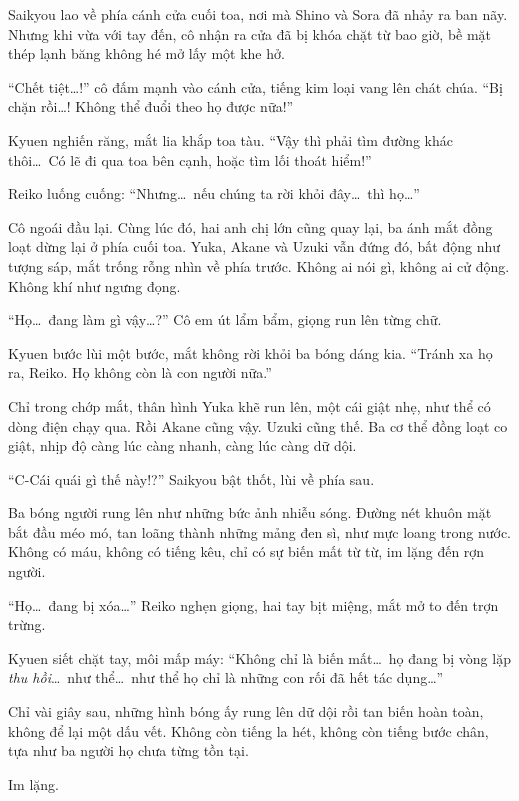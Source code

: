 \documentclass[../main.tex]{subfiles}
\begin{document}
Saikyou lao về phía cánh cửa cuối toa, nơi mà Shino và Sora đã nhảy ra ban nãy. Nhưng khi vừa với tay đến, cô nhận ra cửa đã bị khóa chặt từ bao giờ, bề mặt thép lạnh băng không hé mở lấy một khe hở.

``Chết tiệt\dots!'' cô đấm mạnh vào cánh cửa, tiếng kim loại vang lên chát chúa. ``Bị chặn rồi\dots! Không thể đuổi theo họ được nữa!''

Kyuen nghiến răng, mắt lia khắp toa tàu. ``Vậy thì phải tìm đường khác thôi\dots\ Có lẽ đi qua toa bên cạnh, hoặc tìm lối thoát hiểm!''

Reiko luống cuống: ``Nhưng\dots\ nếu chúng ta rời khỏi đây\dots\ thì họ\dots''

Cô ngoái đầu lại. Cùng lúc đó, hai anh chị lớn cũng quay lại, ba ánh mắt đồng loạt dừng lại ở phía cuối toa. Yuka, Akane và Uzuki vẫn đứng đó, bất động như tượng sáp, mắt trống rỗng nhìn về phía trước. Không ai nói gì, không ai cử động. Không khí như ngưng đọng.


``Họ\dots\ đang làm gì vậy\dots?'' Cô em út lẩm bẩm, giọng run lên từng chữ.

Kyuen bước lùi một bước, mắt không rời khỏi ba bóng dáng kia. ``Tránh xa họ ra, Reiko. Họ không còn là con người nữa.''

Chỉ trong chớp mắt, thân hình Yuka khẽ run lên, một cái giật nhẹ, như thể có dòng điện chạy qua. Rồi Akane cũng vậy. Uzuki cũng thế. Ba cơ thể đồng loạt co giật, nhịp độ càng lúc càng nhanh, càng lúc càng dữ dội.

``C-Cái quái gì thế này!?'' Saikyou bật thốt, lùi về phía sau.

Ba bóng người rung lên như những bức ảnh nhiễu sóng. Đường nét khuôn mặt bắt đầu méo mó, tan loãng thành những mảng đen sì, như mực loang trong nước. Không có máu, không có tiếng kêu, chỉ có sự biến mất từ từ, im lặng đến rợn người.

``Họ\dots\ đang bị xóa\dots'' Reiko nghẹn giọng, hai tay bịt miệng, mắt mở to đến trợn trừng.

Kyuen siết chặt tay, môi mấp máy: ``Không chỉ là biến mất\dots\ họ đang bị vòng lặp \emph{thu hồi}\dots\ như thể\dots\ như thể họ chỉ là những con rối đã hết tác dụng\dots''

Chỉ vài giây sau, những hình bóng ấy rung lên dữ dội rồi tan biến hoàn toàn, không để lại một dấu vết. Không còn tiếng la hét, không còn tiếng bước chân, tựa như ba người họ chưa từng tồn tại.

Im lặng.
\end{document}
